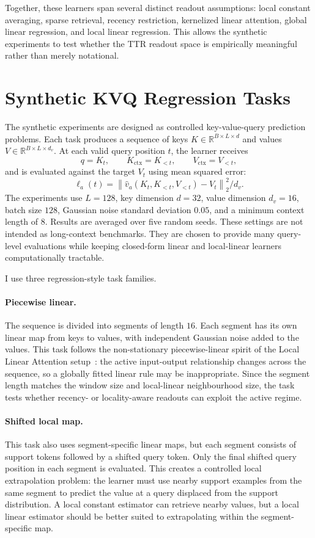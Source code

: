 Together, these learners span several distinct readout assumptions: local constant averaging, sparse retrieval, recency restriction, kernelized linear attention, global linear regression, and local linear regression. This allows the synthetic experiments to test whether the TTR readout space is empirically meaningful rather than merely notational.

\section{Synthetic KVQ Regression Tasks}\label{sec:synthetic_kvq_tasks}

The synthetic experiments are designed as controlled key-value-query prediction problems. Each task produces a sequence of keys \(K \in \mathbb{R}^{B \times L \times d}\) and values \(V \in \mathbb{R}^{B \times L \times d_v}\). At each valid query position \(t\), the learner receives
\[
q = K_t,
\qquad
K_{\mathrm{ctx}} = K_{<t},
\qquad
V_{\mathrm{ctx}} = V_{<t},
\]
and is evaluated against the target \(V_t\) using mean squared error:
\[
\ell_a(t)
=
\left\lVert
\hat v_a(K_t, K_{<t}, V_{<t}) - V_t
\right\rVert_2^2 / d_v .
\]
The experiments use \(L=128\), key dimension \(d=32\), value dimension \(d_v=16\), batch size \(128\), Gaussian noise standard deviation \(0.05\), and a minimum context length of \(8\). Results are averaged over five random seeds. These settings are not intended as long-context benchmarks. They are chosen to provide many query-level evaluations while keeping closed-form linear and local-linear learners computationally tractable.

I use three regression-style task families.

\paragraph{Piecewise linear.}
The sequence is divided into segments of length \(16\). Each segment has its own linear map from keys to values, with independent Gaussian noise added to the values. This task follows the non-stationary piecewise-linear spirit of the Local Linear Attention setup~\cite{zuo2025local}: the active input-output relationship changes across the sequence, so a globally fitted linear rule may be inappropriate. Since the segment length matches the window size and local-linear neighbourhood size, the task tests whether recency- or locality-aware readouts can exploit the active regime.

\paragraph{Shifted local map.}
This task also uses segment-specific linear maps, but each segment consists of support tokens followed by a shifted query token. Only the final shifted query position in each segment is evaluated. This creates a controlled local extrapolation problem: the learner must use nearby support examples from the same segment to predict the value at a query displaced from the support distribution. A local constant estimator can retrieve nearby values, but a local linear estimator should be better suited to extrapolating within the segment-specific map.

